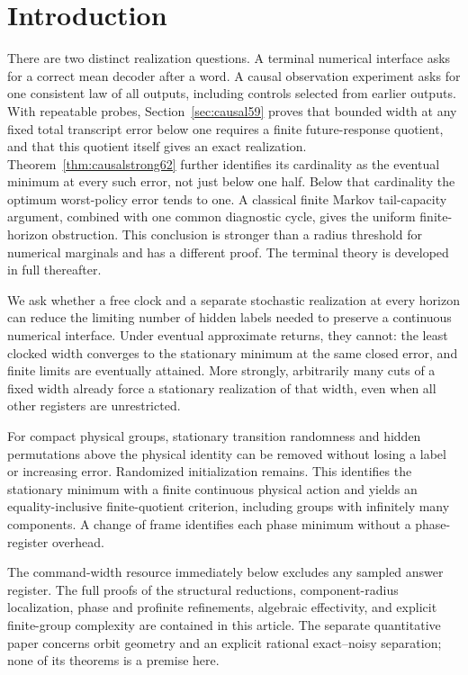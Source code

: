 \section{Introduction}
There are two distinct realization questions. A terminal numerical
interface asks for a correct mean decoder after a word. A causal
observation experiment asks for one consistent law of all outputs,
including controls selected from earlier outputs. With repeatable
probes, Section~\ref{sec:causal59} proves that bounded width at any
fixed total transcript error below one requires a finite future-response
quotient, and that this quotient itself gives an exact realization.
Theorem~\ref{thm:causalstrong62} further identifies its cardinality as
the eventual minimum at every such error, not just below one half.
Below that cardinality the optimum worst-policy error tends to one.
A classical finite Markov tail-capacity argument, combined with one
common diagnostic cycle, gives the uniform finite-horizon obstruction.
This conclusion is stronger than a radius threshold for numerical
marginals and has a different proof. The terminal theory is developed
in full thereafter.

We ask whether a free clock and a separate stochastic realization at
every horizon can reduce the limiting number of hidden labels needed to
preserve a continuous numerical interface. Under eventual approximate
returns, they cannot: the least clocked width converges to the stationary
minimum at the same closed error, and finite limits are eventually
attained. More strongly, arbitrarily many cuts of a fixed width already
force a stationary realization of that width, even when all other
registers are unrestricted.

For compact physical groups, stationary transition randomness and hidden
permutations above the physical identity can be removed without losing
a label or increasing error. Randomized initialization remains. This
identifies the stationary minimum with a finite continuous physical
action and yields an equality-inclusive finite-quotient criterion,
including groups with infinitely many components. A change of frame
identifies each phase minimum without a phase-register overhead.

The command-width resource immediately below excludes any sampled answer
register. The full proofs of the structural reductions, component-radius
localization, phase and profinite refinements, algebraic effectivity, and
explicit finite-group complexity are contained in this article. The
separate quantitative paper concerns orbit geometry and an explicit
rational exact--noisy separation; none of its theorems is a premise here.
